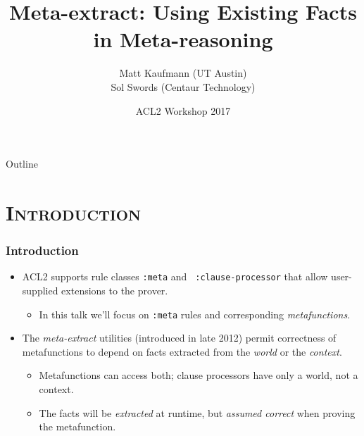
\newcommand\mydotdot{{\color{orange} ...}}





\begin{frame}
\title{Meta-extract: Using Existing Facts in Meta-reasoning}
\author{
        Matt Kaufmann (UT Austin) \\
        Sol Swords (Centaur Technology)
}
\date{
        \vspace{1cm}
        ACL2 Workshop 2017
}
\titlepage
\end{frame}
\begin{frame}{\hspace{4mm}Outline}
\tableofcontents
\end{frame}
\section{\scshape Introduction}
\begin{frame}[fragile]
\frametitle{Introduction}

\begin{itemize}

\item ACL2 supports rule classes {\tt :meta} and {\tt
    :clause-processor} that allow user-supplied extensions to the
  prover.
  
  \begin{itemize}
  \item In this talk we'll focus on {\tt :meta} rules and corresponding
    {\em metafunctions}.
  \end{itemize}
  
\item The {\em meta-extract} utilities (introduced in late 2012)
  permit correctness of metafunctions to depend on facts extracted
  from the {\em world} or the {\em context}.

  \begin{itemize}
  \item Metafunctions can access both; clause processors have only a world, not a context.
  \item The facts will be \textit{extracted} at runtime, but \textit{assumed correct} when proving the metafunction.
  \end{itemize}
\end{itemize}
\end{frame}


